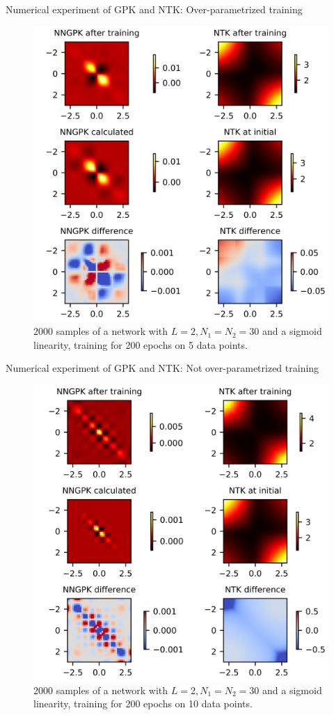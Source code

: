 \documentclass{beamer}
\begin{document}
\begin{frame}{Numerical experiment of GPK and NTK: Over-parametrized training}
	\begin{figure}[h]
  \centering
  \centerline{\includegraphics[width=0.6\linewidth]{kernel-train.jpg}}
  \caption{
  2000 samples of a network with $L = 2, N_1 = N_2 = 30$ and a sigmoid linearity, training for 200 epochs on 5 data points.}
\end{figure}
\end{frame}


\begin{frame}{Numerical experiment of GPK and NTK: Not over-parametrized training}
	\begin{figure}[h]
  \centering
  \centerline{\includegraphics[width=0.6\linewidth]{kernel-train-notover.jpg}}
  \caption{
  2000 samples of a network with $L = 2, N_1 = N_2 = 30$ and a sigmoid linearity, training for 200 epochs on 10 data points.}
\end{figure}
\end{frame}
\end{document}
